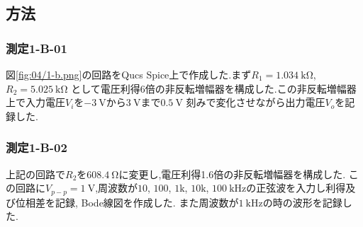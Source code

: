 \subsection{方法}
\subsubsection{測定1-B-01}
図\ref{fig:04/1-b.png}の回路をQucs Spice上で作成した.まず$R_1=1.034\ \si{\kilo\ohm}$, $R_2=5.025\ \si{\kilo\ohm}$
として電圧利得6倍の非反転増幅器を構成した.この非反転増幅器上で入力電圧$V_i$を$-3\ \si{\volt}$から$3\ \si{\volt}$まで$0.5\ \si{\volt}$
刻みで変化させながら出力電圧$V_o$を記録した.
\subsubsection{測定1-B-02}
上記の回路で$R_2$を$608.4\ \si{\ohm}$に変更し,電圧利得1.6倍の非反転増幅器を構成した.
この回路に$V_{p-p}=1\ \si{\volt}$,周波数が$10$, $100$, $1\si{\kilo}$, $10\si{\kilo}$, $100\ \si{\kilo\hertz}$の正弦波を入力し利得及び位相差を記録, Bode線図を作成した.
また周波数が$1\ \si{\kilo\hertz}$の時の波形を記録した.